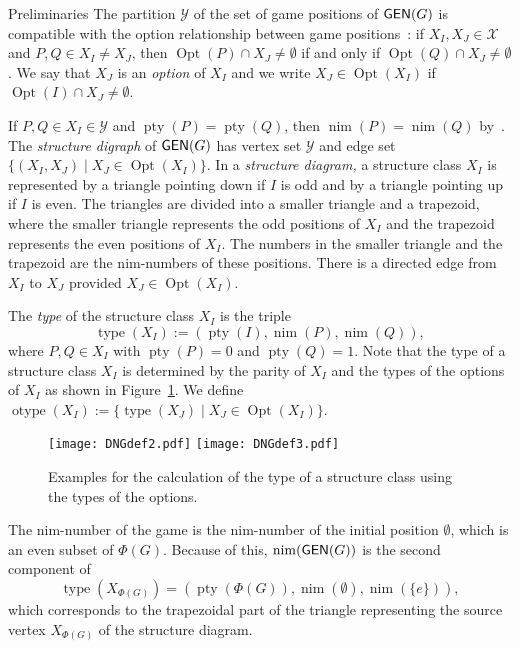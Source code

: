 \documentclass[12pt]{amsart}
\theoremstyle{definition}
\theoremstyle{definition}
\numberwithin{equation}{section}
\begin{document}
\begin{section}{Preliminaries}
The partition $\mathcal{Y}$ 
of the set of game positions of ${\text{\sf GEN}}(G)$ is compatible with
the option relationship between game positions~\cite[Corollary~3.11]{ErnstSieben}: if $X_{I},X_{J}\in\mathcal{X}$
and $P,Q\in X_{I}\ne X_{J}$, then ${\operatorname{Opt}}(P)\cap X_{J}\not=\emptyset$
if and only if ${\operatorname{Opt}}(Q)\cap X_{J}\ne\emptyset$.  We say that $X_{J}$ is an \emph{option} of $X_{I}$ and we write
$X_{J}\in{\operatorname{Opt}}(X_{I})$ if ${\operatorname{Opt}}(I)\cap X_{J}\not=\emptyset$. 

If $P,Q\in X_{I}\in \mathcal{Y}$ and ${\operatorname{pty}}(P)={\operatorname{pty}}(Q)$, then ${\operatorname{nim}}(P)={\operatorname{nim}}(Q)$ by~\cite[Proposition~4.4]{ErnstSieben}.  The \emph{structure digraph} of ${\text{\sf GEN}}(G)$ has vertex set $\mathcal{Y}$ and edge set $\{(X_{I},X_{J})\mid X_{J}\in{\operatorname{Opt}}(X_{I})\}$.  In a \emph{structure diagram,} a structure class $X_{I}$ is represented
by a triangle pointing down if $I$ is odd and by a triangle pointing
up if $I$ is even. The triangles are divided into a smaller triangle
and a trapezoid, where the smaller triangle represents the odd positions
of $X_{I}$ and the trapezoid represents the even positions of $X_{I}$.
The numbers in the smaller triangle and the trapezoid are the nim-numbers
of these positions. There is a directed edge from $X_{I}$ to $X_{J}$
provided $X_{J}\in{\operatorname{Opt}}(X_{I})$.   

The \emph{type} of the structure class $X_{I}$ is the triple 
\[
{\operatorname{type}}(X_{I}):=({\operatorname{pty}}(I),{\operatorname{nim}}(P),{\operatorname{nim}}(Q)),
\]
where $P,Q\in X_{I}$ with ${\operatorname{pty}}(P)=0$ and ${\operatorname{pty}}(Q)=1$. Note that the type of a structure class $X_I$ is determined by the parity of $X_I$ and the types of the options of $X_I$ as shown in Figure~\ref{fig:type}.  
We define 
${\operatorname{otype}}(X_I):=\{{\operatorname{type}}(X_J) \mid X_J \in {\operatorname{Opt}}(X_I)\}$.

\begin{figure}
\texttt{[image: DNGdef2.pdf]} \hfil \texttt{[image: DNGdef3.pdf]}
\caption{\label{fig:type}Examples for the calculation of the type of a structure class using the types of the options.
}
\end{figure}

The nim-number of the game  is the  nim-number 
of the initial position $\emptyset$, which is an even subset of $\Phi(G)$. 
Because of this, ${\operatorname{nim}}({\text{\sf GEN}}(G))$ is the second component of 
\[
{\operatorname{type}}(X_{\Phi(G)}) =({\operatorname{pty}}(\Phi(G)),{\operatorname{nim}}(\emptyset),{\operatorname{nim}}(\{e\})),
\] 
which corresponds to the trapezoidal 
part of the triangle representing the source vertex $X_{\Phi(G)}$ of the structure diagram.


\end{section}
\end{document}
